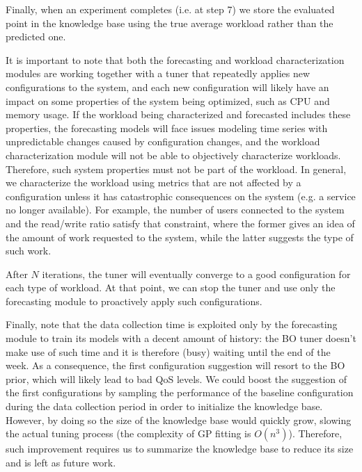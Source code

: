 \documentclass[a4paper, 12pt]{article} %
\begin{document}
	Finally, when an experiment completes (i.e. at step 7) we store the evaluated point in the knowledge base using the true average workload rather than the predicted one.
	
	It is important to note that both the forecasting and workload characterization modules are working together with a tuner that repeatedly applies new configurations to the system, and each new configuration will likely have an impact on some properties of the system being optimized, such as CPU and memory usage. If the workload being characterized and forecasted includes these properties, the forecasting models will face issues modeling time series with unpredictable changes caused by configuration changes, and the workload characterization module will not be able to objectively characterize workloads. Therefore, such system properties must not be part of the workload. In general, we characterize the workload using metrics that are not affected by a configuration unless it has catastrophic consequences on the system (e.g. a service no longer available). For example, the number of users connected to the system and the read/write ratio satisfy that constraint, where the former gives an idea of the amount of work requested to the system, while the latter suggests the type of such work.

	After $N$ iterations, the tuner will eventually converge to a good configuration for each type of workload. At that point, we can stop the tuner and use only the forecasting module to proactively apply such configurations.
	
	Finally, note that the data collection time is exploited only by the forecasting module to train its models with a decent amount of history: the BO tuner doesn't make use of such time and it is therefore (busy) waiting until the end of the week. As a consequence, the first configuration suggestion will resort to the BO prior, which will likely lead to bad QoS levels. We could boost the suggestion of the first configurations by sampling the performance of the baseline configuration during the data collection period in order to initialize the knowledge base. However, by doing so the size of the knowledge base would quickly grow, slowing the actual tuning process (the complexity of GP fitting is $O(n^3)$). Therefore, such improvement requires us to summarize the knowledge base to reduce its size and is left as future work.
\end{document}
